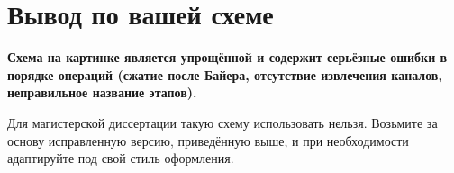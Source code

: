 \documentclass[12pt,a4paper]{article}
\begin{document}
\section{Вывод по вашей схеме}

\textbf{Схема на картинке является упрощённой и содержит серьёзные ошибки в порядке операций (сжатие после Байера, отсутствие извлечения каналов, неправильное название этапов).}  

Для магистерской диссертации такую схему использовать нельзя. Возьмите за основу исправленную версию, приведённую выше, и при необходимости адаптируйте под свой стиль оформления.
\end{document}
